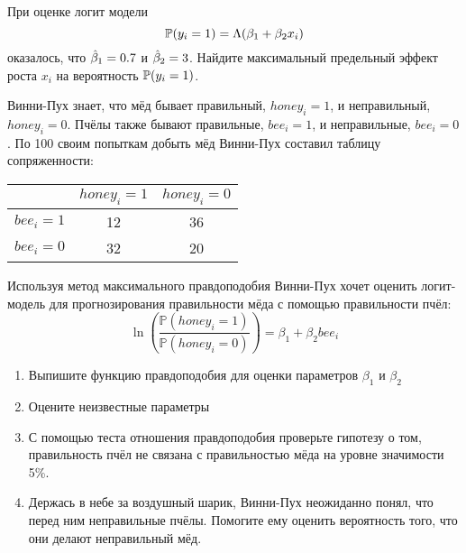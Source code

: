 \documentclass[pdftex,11pt,openany]{book}\usepackage[]{graphicx}\usepackage[]{color}
\begin{document}
\begin{problem}
При оценке логит модели 
\[
\P(y_i=1)=\Lambda(\b_1+\b_2 x_i)
\]
оказалось, что $\hb_1=0.7$ и $\hb_2=3$. Найдите максимальный предельный эффект роста $x_i$ на вероятность $\P(y_i=1)$.
\end{problem}
\begin{solution}
\end{solution}


\begin{problem}
Винни-Пух знает, что мёд бывает правильный, $honey_i=1$, и неправильный, $honey_i=0$. Пчёлы также бывают правильные, $bee_i=1$, и неправильные, $bee_i=0$. По 100 своим попыткам добыть мёд Винни-Пух составил таблицу сопряженности:

\begin{tabular}{c|cc}
 & $honey_i=1$ & $honey_i=0$ \\ 
\hline 
$bee_i=1$ & 12 & 36 \\ 
$bee_i=0$ & 32 & 20 \\ 
\end{tabular} 

Используя метод максимального правдоподобия Винни-Пух хочет оценить логит-модель для прогнозирования правильности мёда с помощью правильности пчёл:
\[
\ln \left(\frac{\mathbb{P}(honey_i=1)}{\mathbb{P}(honey_i=0)} \right)=\beta_1 + \beta_2 bee_i 
\]
\begin{enumerate}
\item Выпишите функцию правдоподобия для оценки параметров $\beta_1$ и $\beta_2$
\item Оцените неизвестные параметры
\item С помощью теста отношения правдоподобия проверьте гипотезу о том, правильность пчёл не связана с правильностью мёда на уровне значимости 5\%.
\item Держась в небе за воздушный шарик, Винни-Пух неожиданно понял, что перед ним неправильные пчёлы. Помогите ему оценить вероятность того, что они делают неправильный мёд.
\end{enumerate}
\end{problem}
\end{document}
